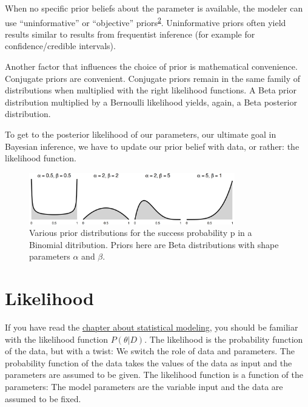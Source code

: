 \documentclass[
  10pt,
]{scrbook}
\begin{document}
When no specific prior beliefs about the parameter is available, the modeler can use ``uninformative'' or ``objective'' priors\textsuperscript{\protect\hyperlink{ref-yang1996catalog}{2}}.
Uninformative priors often yield results similar to results from frequentist inference (for example for confidence/credible intervals).

Another factor that influences the choice of prior is mathematical convenience.
Conjugate priors are convenient.
Conjugate priors remain in the same family of distributions when multiplied with the right likelihood functions.
A Beta prior distribution multiplied by a Bernoulli likelihood yields, again, a Beta posterior distribution.

To get to the posterior likelihood of our parameters, our ultimate goal in Bayesian inference, we have to update our prior belief with data, or rather: the likelihood function.

\begin{figure}

{\centering \includegraphics[width=0.8\textwidth]{figures/priors-1} 

}

\caption{Various prior distributions for the success probability p in a Binomial ditribution. Priors here are Beta distributions with shape parameters $\alpha$ and $\beta$.}\label{fig:priors}
\end{figure}

\hypertarget{likelihood}{%
\section{Likelihood}\label{likelihood}}

If you have read the \protect\hyperlink{statistical-modeling}{chapter about statistical modeling}, you should be familiar with the likelihood function \(P(\theta | D)\).
The likelihood is the probability function of the data, but with a twist:
We switch the role of data and parameters.
The probability function of the data takes the values of the data as input and the parameters are assumed to be given.
The likelihood function is a function of the parameters: The model parameters are the variable input and the data are assumed to be fixed.
\end{document}
